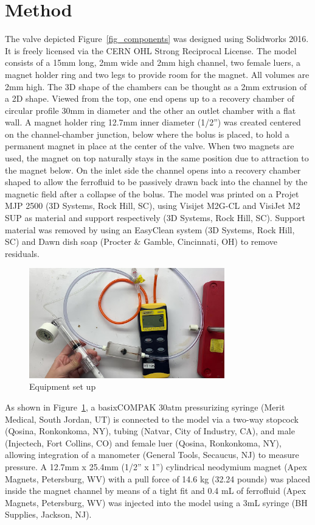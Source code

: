\documentclass[twocolumn,10pt]{asme2ej}
\begin{document}
\section{Method}

The valve depicted Figure~\ref{fig_components}
was designed using Solidworks 2016.
It is freely licensed via the CERN OHL Strong Reciprocal License\cite{stuckey2021}.
The model consists of a 15mm long, 2mm wide and 2mm high channel,
two female luers, a magnet holder ring and two legs to provide room
for the magnet.  All volumes are 2mm high.
The 3D shape
of the chambers can be thought as a 2mm extrusion of a 2D shape.
Viewed from the top, one end opens up to a recovery
chamber of circular profile 30mm in diameter and the other
an outlet chamber with a flat wall.
A magnet holder ring 12.7mm inner diameter (1/2'') was created centered on the channel-chamber
junction, below where the bolus is placed, to hold a permanent magnet in place
at the center of the valve. When two magnets are used, the magnet on
top naturally stays in the same position due to attraction to the magnet below.
On the inlet side the channel
opens into a recovery chamber shaped to allow the ferrofluid to be
passively drawn back into the channel by the magnetic field after a
collapse of the bolus.
The model was printed on a Projet MJP 2500 (3D
Systems, Rock Hill, SC), using Visijet M2G-CL and VisiJet M2 SUP as
material and support respectively (3D Systems, Rock Hill, SC). Support
material was removed by using an EasyClean system (3D Systems, Rock
Hill, SC) and Dawn dish soap (Procter \& Gamble, Cincinnati, OH) to
remove residuals.


\begin{figure}
\centerline{\includegraphics[width=3.34in]{figure/equipment.jpeg}}
\caption{Equipment set up}
\label{fig_equipment}
\end{figure}

As shown in Figure~\ref{fig_equipment},
a basixCOMPAK 30atm pressurizing syringe (Merit Medical, South Jordan,
UT) is connected to the model via a two-way stopcock (Qosina,
Ronkonkoma, NY), tubing (Natvar, City of Industry, CA), and male
(Injectech, Fort Collins, CO) and female luer (Qosina, Ronkonkoma,
NY), allowing integration of a manometer (General Tools, Secaucus, NJ)
to measure pressure. A 12.7mm x 25.4mm (1/2” x 1”)
cylindrical neodymium magnet (Apex
Magnets, Petersburg, WV) with a pull force of 14.6 kg (32.24 pounds)
was placed inside the magnet channel by means
of a tight fit and 0.4 mL of ferrofluid (Apex Magnets, Petersburg, WV)
was injected into the model using a 3mL syringe (BH Supplies, Jackson,
NJ).
\end{document}
